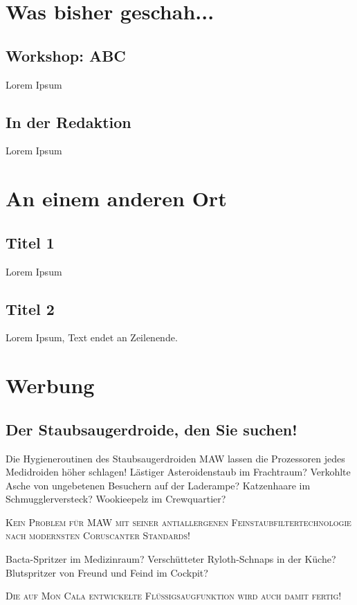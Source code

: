 \documentclass[final]{multiversum}
\begin{document}
\makemultititle
%

\section{Was bisher geschah...}

\subsection{Workshop: ABC}
Lorem Ipsum

\subsection{In der Redaktion}
Lorem Ipsum

\section{An einem anderen Ort}

\subsection{Titel 1}
Lorem Ipsum

\subsection{Titel 2}
Lorem Ipsum, Text endet an Zeilenende.


\section{Werbung}
\subsection{Der Staubsaugerdroide, den Sie suchen!}

Die Hygieneroutinen des Staubsaugerdroiden MAW lassen die Prozessoren jedes Medidroiden höher schlagen!
Lästiger Asteroidenstaub im Frachtraum?
Verkohlte Asche von ungebetenen Besuchern auf der Laderampe?
Katzenhaare im Schmugglerversteck? Wookieepelz im Crewquartier?\\
\begin{center}\textsc{Kein Problem für MAW mit seiner antiallergenen Feinstaubfiltertechnologie nach modernsten Coruscanter Standards!}\\\end{center}
Bacta-Spritzer im Medizinraum?
Verschütteter Ryloth-Schnaps in der Küche?
Blutspritzer von Freund und Feind im Cockpit?\\
\begin{center}\textsc{Die auf Mon Cala entwickelte Flüssigsaugfunktion wird auch damit fertig!}\\\end{center}
\end{document}
